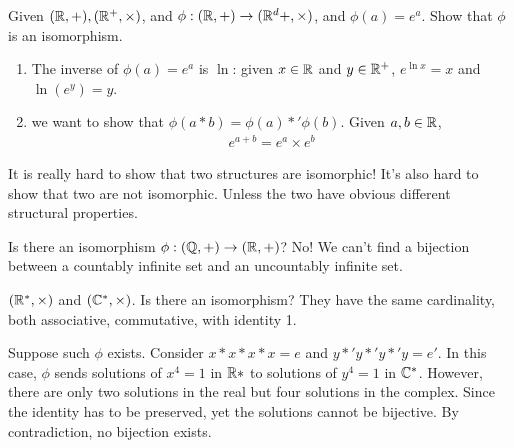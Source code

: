 \documentclass[class=article,crop=false]{standalone}
\begin{document}
\begin{eg}[]
	Given $(\mathbb{R},+), (\mathbb{R}^{+},\times )$, and $\phi:(\mathbb{R},+) \to (\mathbb{R}^d{+},\times )$, and $\phi(a) = e^{a} $. Show that $\phi$ is an isomorphism.

\begin{prf}
\begin{enumerate}[label=\arabic*)]
	\item The inverse of $\phi(a) = e^{a} $ is $\ln$: given $x \in \mathbb{R}$ and $y \in \mathbb{R}^{+}$, $e^{\ln x} = x$ and $\ln(e^{y}) = y$.
	\item we want to show that $ \phi(a*b) = \phi(a) *' \phi(b)  $. Given $a,b \in \mathbb{R}$,
		\begin{align*}
			e^{a+b} = e^{a} \times e^{b}
		\end{align*}
\end{enumerate}
\end{prf}
\end{eg}
\begin{note}[]
It is really hard to show that two structures are isomorphic! It's also hard to show that two are not isomorphic. Unless the two have obvious different structural properties. 
\end{note}

\begin{eg}[]
	Is there an isomorphism $\phi:(\mathbb{Q},+) \to (\mathbb{R},+)$? No! We can't find a bijection between a countably infinite set and an uncountably infinite set.
\end{eg}
\begin{eg}[]
	$(\mathbb{R}^* , \times )$ and $(\mathbb{C}^* , \times )$. Is there an isomorphism? They have the same cardinality, both associative, commutative, with identity 1.

\begin{prf}
	Suppose such $\phi$ exists. Consider $x * x * x * x = e$ and $y *' y*' y*' y = e'$. In this case, $\phi$ sends solutions of $x^{4}=1$ in $\mathbb{R}*$ to solutions of $y^{4}=1$ in $\mathbb{C}^* $. However, there are only two solutions in the real but four solutions in the complex. Since the identity has to be preserved, yet the solutions cannot be bijective. By contradiction, no bijection exists.
\end{prf}
\end{eg}
\end{document}

